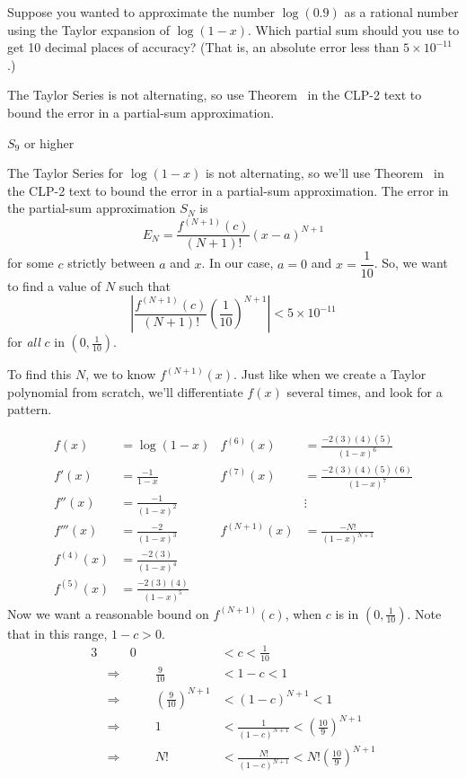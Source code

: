 \begin{Mquestion}
Suppose you wanted to approximate the number $\log(0.9)$ as a rational number using the Taylor expansion of $\log(1-x)$. Which partial sum should you use to get 10 decimal places of accuracy?
(That is, an absolute error less than $5\times10^{-11}$.)
\end{Mquestion}
\begin{hint}
The Taylor Series is not alternating, so use  Theorem~ in the CLP-2 text to bound the error in a partial-sum approximation.
\end{hint}
\begin{answer}
	$S_9$ or higher
\end{answer}
\begin{solution}
The Taylor Series for $\log(1-x)$ is not alternating, so we'll use  Theorem~ in the CLP-2 text to bound the error in a partial-sum approximation. The error in the partial-sum approximation $S_N$ is
\[E_N=\frac{f^{(N+1)}(c)}{(N+1)!}(x-a)^{N+1}\]
for some $c$ strictly between $a$ and $x$. In our case, $a=0$ and $x=\dfrac1{10}$. So, we want to find a value of $N$ such that
\[\left|\frac{f^{(N+1)}(c)}{(N+1)!}\left(\frac{1}{10}\right)^{N+1}\right|<5\times 10^{-11}\]
for \emph{all} $c$ in $(0,\frac1{10})$.

To find this $N$, we to know $f^{(N+1)}(x)$. Just like when we create a Taylor polynomial from scratch, we'll differentiate $f(x)$ several times, and look for a pattern.

\begin{align*}
f(x)&=\log(1-x)&f^{(6)}(x)&=\frac{-2(3)(4)(5)}{(1-x)^6}\\
f'(x)&=\frac{-1}{1-x}&f^{(7)}(x)&=\frac{-2(3)(4)(5)(6)}{(1-x)^7}\\
f''(x)&=\frac{-1}{(1-x)^2}&&\vdots\\
f'''(x)&=\frac{-2}{(1-x)^3}&f^{(N+1)}(x)&=\frac{-N!}{(1-x)^{N+1}}\\
f^{(4)}(x)&=\frac{-2(3)}{(1-x)^4}\\
f^{(5)}(x)&=\frac{-2(3)(4)}{(1-x)^5}
\end{align*}
Now we want a reasonable bound on $f^{(N+1)}(c)$, when $c$ is in $(0,\frac{1}{10})$. Note that in this range, $1-c>0$.
\begin{alignat*}{3}
&&0 &<c<\frac{1}{10}\\
&\Rightarrow&\qquad \frac{9}{10} &<1-c<1\\
&\Rightarrow&\qquad \left(\frac{9}{10}\right)^{N+1} &<(1-c)^{N+1}<1\\
&\Rightarrow&\qquad 1&<\frac{1}{(1-c)^{N+1}}<\left(\frac{10}{9}\right)^{N+1}\\
&\Rightarrow&\qquad N!&<\frac{N!}{(1-c)^{N+1}}<N!\left(\frac{10}{9}\right)^{N+1}
\end{alignat*}


\end{solution}
